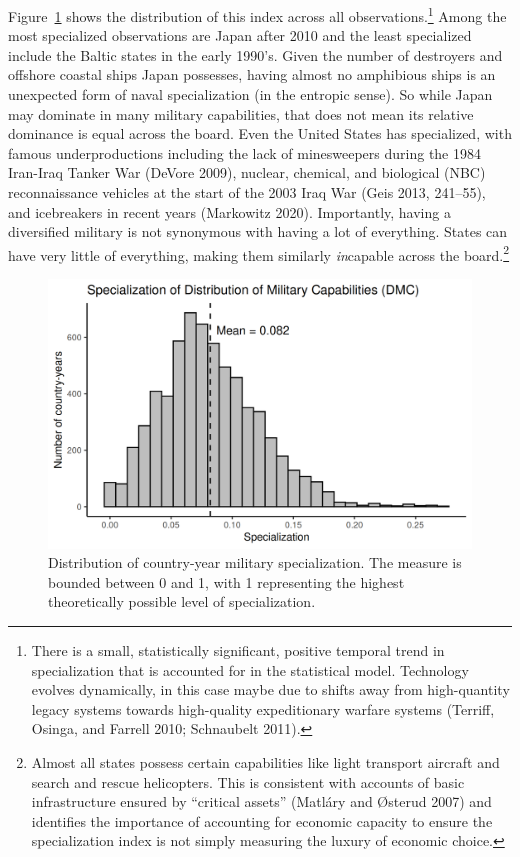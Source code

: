\documentclass[
  12,
  letterpaper,
  DIV=11,
  numbers=noendperiod]{scrartcl}
\begin{document}
Figure~\ref{fig-spec_scores} shows the distribution of this index across
all observations.\footnote{There is a small, statistically significant,
  positive temporal trend in specialization that is accounted for in the
  statistical model. Technology evolves dynamically, in this case maybe
  due to shifts away from high-quantity legacy systems towards
  high-quality expeditionary warfare systems (Terriff, Osinga, and
  Farrell 2010; Schnaubelt 2011).} Among the most specialized
observations are Japan after 2010 and the least specialized include the
Baltic states in the early 1990's. Given the number of destroyers and
offshore coastal ships Japan possesses, having almost no amphibious
ships is an unexpected form of naval specialization (in the entropic
sense). So while Japan may dominate in many military capabilities, that
does not mean its relative dominance is equal across the board. Even the
United States has specialized, with famous underproductions including
the lack of minesweepers during the 1984 Iran-Iraq Tanker War (DeVore
2009), nuclear, chemical, and biological (NBC) reconnaissance vehicles
at the start of the 2003 Iraq War (Geis 2013, 241--55), and icebreakers
in recent years (Markowitz 2020). Importantly, having a diversified
military is not synonymous with having a lot of everything. States can
have very little of everything, making them similarly \emph{in}capable
across the board.\footnote{Almost all states possess certain
  capabilities like light transport aircraft and search and rescue
  helicopters. This is consistent with accounts of basic infrastructure
  ensured by ``critical assets'' (Matláry and Østerud 2007) and
  identifies the importance of accounting for economic capacity to
  ensure the specialization index is not simply measuring the luxury of
  economic choice.}

\begin{figure}[h]

{\centering \includegraphics{2023-04-04_Specialization_files/figure-pdf/fig-spec_scores-1.png}

}

\caption{\label{fig-spec_scores}Distribution of country-year military
specialization. The measure is bounded between 0 and 1, with 1
representing the highest theoretically possible level of
specialization.}

\end{figure}
\end{document}
